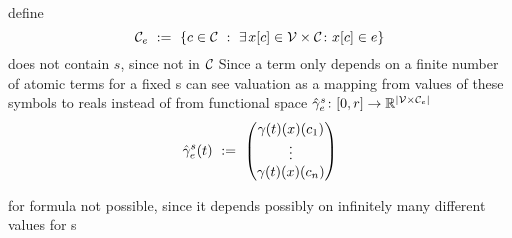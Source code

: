    \begin{definition}\label{def:termvars}
        define
        \begin{equation*}
            \constants[\astrm] \defeq \set{c\in\constants \with \mexists{\xtau[c]\in\delayvars}\holds\xtau[c]\in\astrm}
        \end{equation*}
        does not contain $s$, since not in $\constants$
        Since a term only depends on a finite number of atomic terms for a fixed s
        can see valuation as a mapping from values of these symbols to reals
        instead of from functional space
        $\augtrajectory[s]{\astrm}\from\compactum{0}{r}\to\R^{\abs{\delayvars[\astrm]}}$
        \begin{equation*}
            \augtrajectory[s]{\astrm}(t) \defeq \colvec{\trajectory(t)(x)(c_1)\\ \vdots\\ \trajectory(t)(x)(c_n)}
        \end{equation*}
    \end{definition}

    for formula not possible, since it depends possibly on infinitely many different values for s

